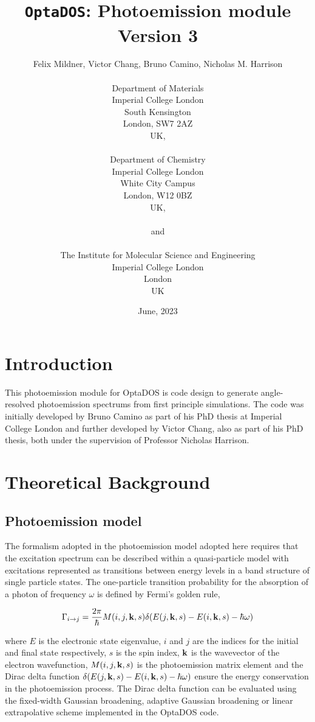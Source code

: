 \documentclass[a4paper,11pt,twoside]{book}
\title{{\huge {\tt OptaDOS}: Photoemission module}\\ {Version 3}}
\author{Felix Mildner, Victor Chang, Bruno Camino, Nicholas M. Harrison \\
\\
Department of Materials\\
Imperial College London\\
South Kensington\\
London, SW7 2AZ\\
UK,\\
\\
Department of Chemistry\\
Imperial College London\\
White City Campus\\
London, W12 0BZ\\
UK,\\
\\
{\small and} \\
\\
The Institute for Molecular Science and Engineering\\
Imperial College London\\
London\\
UK}
\date{June, 2023}
\begin{document}
\newcommand{\optados}{\textsc{OptaDOS}}
\newcommand{\lindos}{\texttt{LinDOS}}
\newcommand{\onetep}{\textsc{onetep}}
\newcommand{\castep}{\textsc{castep}}
\maketitle

 \thispagestyle{empty}







\chapter{Introduction}\label{chap:introduction}

This photoemission module for OptaDOS is code design to generate angle-resolved photoemission spectrums from first principle simulations. The code was initially developed by Bruno Camino as part of his PhD thesis at Imperial College London and further developed by Victor Chang, also as part of his PhD thesis, both under the supervision of Professor Nicholas Harrison.


\chapter{Theoretical Background} \label{sec:theory}

\section{Photoemission model}

The formalism adopted in the photoemission model adopted here requires that the excitation spectrum can be described within a quasi-particle model with excitations represented as transitions between energy levels in a  band structure of single particle states. The one-particle transition probability for the absorption of a photon of frequency $\omega$ is defined by Fermi's golden rule,

\begin{equation}
\Gamma_{i \rightarrow j} = \frac{2 \pi}{\hbar} M (i,j,{\bf{k}},s  ) \delta(E{(j,{\bf{k}},s)}-E{(i,{\bf{k}},s)}-\hbar \omega  )
    \label{fermi_golden_rule}
\end{equation}

where $E$ is the electronic state eigenvalue, $i$ and $j$ are the indices for the initial and final state respectively, $s$ is the spin index, $\bf{k}$ is the wavevector of the electron wavefunction, $M(i,j,{\bf{k}},s)$ is the photoemission matrix element and the Dirac delta function $\delta(E{(j,{\bf{k}},s)}-E{(i,{\bf{k}},s)}-\hbar \omega)$ ensure the energy conservation in the photoemission process. The Dirac delta function can be evaluated using the fixed-width Gaussian broadening, adaptive Gaussian broadening or linear extrapolative scheme implemented in the OptaDOS code.
\end{document}
